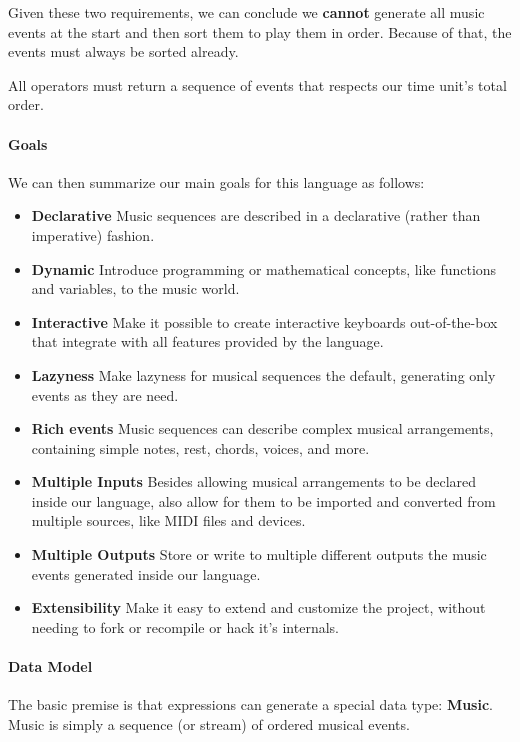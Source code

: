 \documentclass[a4paper,UKenglish,cleveref, autoref]{oasics-v2019}
\begin{document}
Given these two requirements, we can conclude we \textbf{cannot} generate all music events at the start and then sort them to play them in order. Because of that, the events must always be sorted already.

\begin{lemma}
\label{lemma:total-order} All operators must return a sequence of events that respects our time unit's total order.
\end{lemma}

\paragraph*{Goals}
We can then summarize our main goals for this language as follows:
\begin{itemize}
 \item \textbf{Declarative} Music sequences are described in a declarative (rather than imperative) fashion.
 \item \textbf{Dynamic} Introduce programming or mathematical concepts, like functions and variables, to the music world.
 \item \textbf{Interactive} Make it possible to create interactive keyboards out-of-the-box that integrate with all features provided by the language.
 \item \textbf{Lazyness} Make lazyness for musical sequences the default, generating only events as they are need.
 \item \textbf{Rich events} Music sequences can describe complex musical arrangements, containing simple notes, rest, chords, voices, and more.
 \item \textbf{Multiple Inputs} Besides allowing musical arrangements to be declared inside our language, also allow for them to be imported and converted from multiple sources, like MIDI files and devices.
 \item \textbf{Multiple Outputs} Store or write to multiple different outputs the music events generated inside our language.
 \item \textbf{Extensibility} Make it easy to extend and customize the project, without needing to fork or recompile or hack it's internals.
\end{itemize}

\paragraph*{Data Model}
The basic premise is that expressions can generate a special data type: \textbf{Music}. Music is simply a sequence (or stream) of ordered musical events.
\end{document}
